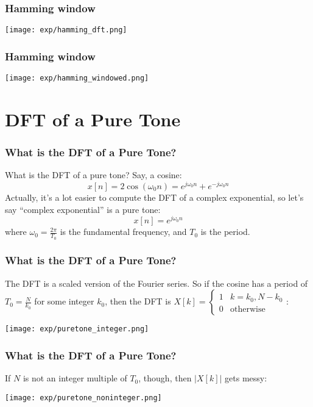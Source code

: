 \documentclass{beamer}
\begin{document}
\begin{frame}
  \frametitle{Hamming window}

  \centerline{\texttt{[image: exp/hamming\_dft.png]}}
\end{frame}

\begin{frame}
  \frametitle{Hamming window}

  \centerline{\texttt{[image: exp/hamming\_windowed.png]}}
\end{frame}

\section[Tones]{DFT of a Pure Tone}
\setcounter{subsection}{1}

\begin{frame}
  \frametitle{What is the DFT of a Pure Tone?}

  What is the DFT of a pure tone?  Say, a cosine:
  \[
  x[n] = 2\cos(\omega_0 n)=e^{j\omega_0 n}+e^{-j\omega_0 n}
  \]
  Actually, it's a lot easier to compute the DFT of
  a complex exponential, so let's say ``complex exponential'' is a pure tone:
  \[
  x[n] = e^{j\omega_0 n}
  \]
  where $\omega_0=\frac{2\pi}{T_0}$ is the fundamental frequency, and
  $T_0$ is the period.
\end{frame}

\begin{frame}
  \frametitle{What is the DFT of a Pure Tone?}

  The DFT is a scaled version of the Fourier series.  So if the cosine
  has a period of $T_0=\frac{N}{k_0}$ for some integer $k_0$, then the
  DFT is
  $X[k]=\begin{cases}1&k=k_0,N-k_0\\0&\mbox{otherwise}\end{cases}$:

  \centerline{\texttt{[image: exp/puretone\_integer.png]}}
\end{frame}

\begin{frame}
  \frametitle{What is the DFT of a Pure Tone?}

  If $N$ is not an integer multiple of $T_0$, though, then $|X[k]|$ gets messy:

  \centerline{\texttt{[image: exp/puretone\_noninteger.png]}}
\end{frame}
\end{document}
